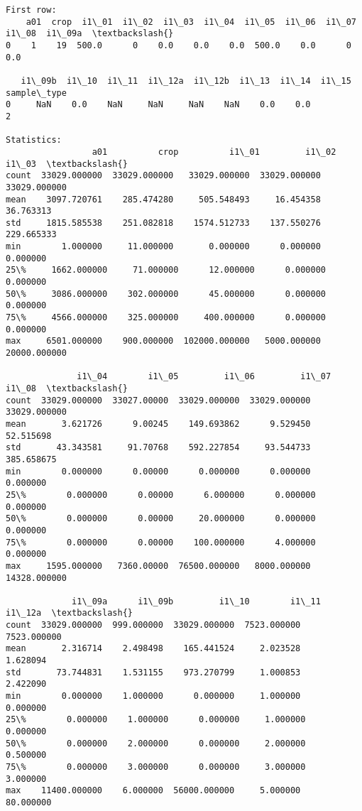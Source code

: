 \documentclass[11pt]{article}
\begin{document}
\begin{Verbatim}[commandchars=\\\{\}]
First row: 
    a01  crop  i1\_01  i1\_02  i1\_03  i1\_04  i1\_05  i1\_06  i1\_07  i1\_08  i1\_09a  \textbackslash{}
0    1    19  500.0      0    0.0    0.0    0.0  500.0    0.0      0     0.0   

   i1\_09b  i1\_10  i1\_11  i1\_12a  i1\_12b  i1\_13  i1\_14  i1\_15  sample\_type  
0     NaN    0.0    NaN     NaN     NaN    NaN    0.0    0.0            2  

Statistics: 
                 a01          crop          i1\_01         i1\_02         i1\_03  \textbackslash{}
count  33029.000000  33029.000000   33029.000000  33029.000000  33029.000000   
mean    3097.720761    285.474280     505.548493     16.454358     36.763313   
std     1815.585538    251.082818    1574.512733    137.550276    229.665333   
min        1.000000     11.000000       0.000000      0.000000      0.000000   
25\%     1662.000000     71.000000      12.000000      0.000000      0.000000   
50\%     3086.000000    302.000000      45.000000      0.000000      0.000000   
75\%     4566.000000    325.000000     400.000000      0.000000      0.000000   
max     6501.000000    900.000000  102000.000000   5000.000000  20000.000000   

              i1\_04        i1\_05         i1\_06         i1\_07         i1\_08  \textbackslash{}
count  33029.000000  33027.00000  33029.000000  33029.000000  33029.000000   
mean       3.621726      9.00245    149.693862      9.529450     52.515698   
std       43.343581     91.70768    592.227854     93.544733    385.658675   
min        0.000000      0.00000      0.000000      0.000000      0.000000   
25\%        0.000000      0.00000      6.000000      0.000000      0.000000   
50\%        0.000000      0.00000     20.000000      0.000000      0.000000   
75\%        0.000000      0.00000    100.000000      4.000000      0.000000   
max     1595.000000   7360.00000  76500.000000   8000.000000  14328.000000   

             i1\_09a      i1\_09b         i1\_10        i1\_11       i1\_12a  \textbackslash{}
count  33029.000000  999.000000  33029.000000  7523.000000  7523.000000   
mean       2.316714    2.498498    165.441524     2.023528     1.628094   
std       73.744831    1.531155    973.270799     1.000853     2.422090   
min        0.000000    1.000000      0.000000     1.000000     0.000000   
25\%        0.000000    1.000000      0.000000     1.000000     0.000000   
50\%        0.000000    2.000000      0.000000     2.000000     0.500000   
75\%        0.000000    3.000000      0.000000     3.000000     3.000000   
max    11400.000000    6.000000  56000.000000     5.000000    80.000000   


\end{Verbatim}
\end{document}
